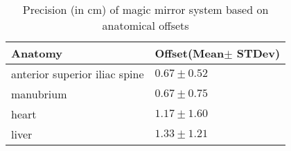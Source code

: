 \begin{table}
	\caption{Precision (in cm) of magic mirror system based on anatomical offsets}
	\label{tb:3-PRMM:results1}
	\scriptsize
	\begin{center}
		\begin{tabular}{p{4cm}|p{3cm}}
			Anatomy & Offset(Mean$\pm$ STDev) \\
			\hline
			anterior superior iliac spine & $0.67\pm0.52$\\
			manubrium & $0.67\pm0.75$ \\
			heart & $1.17\pm1.60$\\
			liver & $1.33\pm1.21$
		\end{tabular}
	\end{center}
\end{table}